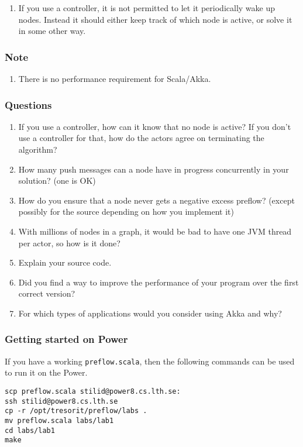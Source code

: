 \documentclass{forsete}
\begin{document}
{\begin{enumerate}
The reason is that the default way of thinking with actors should be ''send a message and wait for any message'', i.e. with !

(Motivation: without forbidding ? between nodes, it is ''too easy'' to use messages as normal method/function calls (but that limits concurrency normally).
If you think of a chat server when it sends a text to many phones, it would be too slow to send one at a time with ?
)

\item If you use a controller, it is not permitted to let it periodically wake up nodes. Instead it should either keep 
track of which node is active, or solve it in some other way.
\end{enumerate}

\subsubsection*{Note}
\begin{enumerate}
\item There is no performance requirement for Scala/Akka.
\end{enumerate}

\subsubsection*{Questions}
\begin{enumerate}
\item If you use a controller, how can it know that no node is active? If you don't use a controller for that, how do the actors agree on
terminating the algorithm?
\item How many push messages can a node have in progress concurrently in your solution? (one is OK)
\item How do you ensure that a node never gets a negative excess preflow? (except possibly for the source depending on how you implement it)
\item With millions of nodes in a graph, it would be bad to have one JVM thread per actor, so how is it done?
\item Explain your source code.
\item Did you find a way to improve the performance of your program over the first correct version?
\item For which types of applications would you consider using Akka and why?
\end{enumerate}

\subsubsection*{Getting started on Power}
If you have a working \verb!preflow.scala!, then the following commands can be used to run it on the Power.
\begin{verbatim}
scp preflow.scala stilid@power8.cs.lth.se:
ssh stilid@power8.cs.lth.se
cp -r /opt/tresorit/preflow/labs .
mv preflow.scala labs/lab1
cd labs/lab1
make
\end{verbatim}

}
\end{document}
